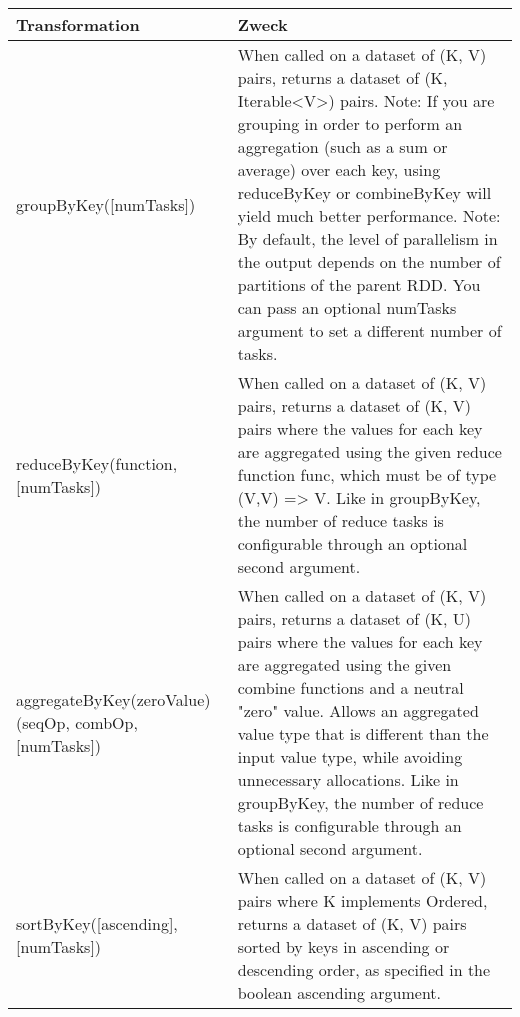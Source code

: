 \begin{tabular}{| p{5cm} | p{8cm} | }
\hline
Transformation & Zweck \\ \hline \hline
groupByKey([numTasks]) & When called on a dataset of (K, V) pairs, returns a dataset of (K, Iterable<V>) pairs. 
Note: If you are grouping in order to perform an aggregation (such as a sum or average) over each key, using reduceByKey or combineByKey will yield much better performance. 
Note: By default, the level of parallelism in the output depends on the number of partitions of the parent RDD. You can pass an optional numTasks argument to set a different number of tasks. \\ \hline 
reduceByKey(function, [numTasks]) & When called on a dataset of (K, V) pairs, returns a dataset of (K, V) pairs where the values for each key are aggregated using the given reduce function func, which must be of type (V,V) => V. Like in groupByKey, the number of reduce tasks is configurable through an optional second argument. \\ \hline 
aggregateByKey(zeroValue) (seqOp, combOp, [numTasks]) & When called on a dataset of (K, V) pairs, returns a dataset of (K, U) pairs where the values for each key are aggregated using the given combine functions and a neutral "zero" value. Allows an aggregated value type that is different than the input value type, while avoiding unnecessary allocations. Like in groupByKey, the number of reduce tasks is configurable through an optional second argument. \\ \hline
sortByKey([ascending], [numTasks]) & When called on a dataset of (K, V) pairs where K implements Ordered, returns a dataset of (K, V) pairs sorted by keys in ascending or descending order, as specified in the boolean ascending argument.  \\ \hline
\end{tabular}

